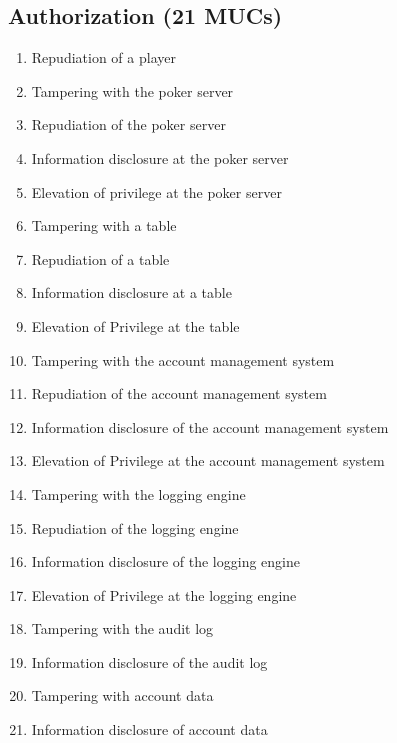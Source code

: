\documentclass[a4paper,11pt]{report}
\begin{document}
\subsection{Authorization (21 MUCs)}
\begin{enumerate}
\item Repudiation of a player
\item Tampering with the poker server
\item Repudiation of the poker server
\item Information disclosure at the poker server
\item Elevation of privilege at the poker server
\item Tampering with a table
\item Repudiation of a table
\item Information disclosure at a table
\item Elevation of Privilege at the table
\item Tampering with the account management system
\item Repudiation of the account management system
\item Information disclosure of the account management system
\item Elevation of Privilege at the account management system
\item Tampering with the logging engine
\item Repudiation of the logging engine
\item Information disclosure of the logging engine
\item Elevation of Privilege at the logging engine
\item Tampering with the audit log
\item Information disclosure of the audit log
\item Tampering with account data
\item Information disclosure of account data
\end{enumerate}
\end{document}
